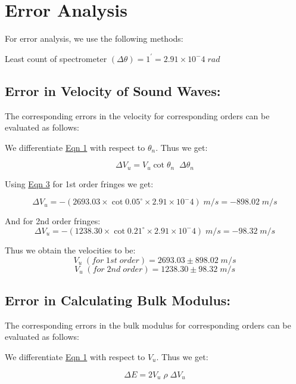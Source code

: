 \section{Error Analysis}

	For error analysis, we use the following methods:

	Least count of spectrometer $(\Delta \theta) = 1^{'} = 2.91 \times 10^-4 \; rad$

	\subsection{Error in Velocity of Sound Waves:}
		The corresponding errors in the velocity for corresponding orders can be evaluated as follows:

		\vspace{3mm}
		We differentiate \hyperref[eqn:1]{Eqn 1} with respect to $\theta_n$. Thus we get:

		\begin{equation}
			\Delta V_u = V_u \cot \theta_n\;\;\Delta\theta_n
		\end{equation}\label{eqn:3}

		Using \hyperref[eqn:3]{Eqn 3} for 1st order fringes we get:
		
		\vspace{-5mm}
		$$\Delta V_u = -(2693.03 \times \cot0.05^\circ \times 2.91 \times 10^-4) \; m/s = -898.02 \; m/s$$

		And for 2nd order fringes:
		$$\Delta V_u = -(1238.30 \times \cot0.21^\circ \times 2.91 \times 10^-4) \; m/s = -98.32 \; m/s$$

		Thus we obtain the velocities to be:
		$$V_u\;(for\;1st\;order) = 2693.03 \pm 898.02\;m/s$$
		$$V_u\;(for\;2nd\;order) = 1238.30 \pm 98.32\;m/s$$

	\subsection{Error in Calculating Bulk Modulus:}
	The corresponding errors in the bulk modulus for corresponding orders can be evaluated as follows:

	\vspace{3mm}
	We differentiate \hyperref[eqn:1]{Eqn 1} with respect to $V_u$. Thus we get:

	\begin{equation}
		\Delta E = 2V_u \; \rho \;\Delta V_u
	\end{equation}\label{eqn:4}

